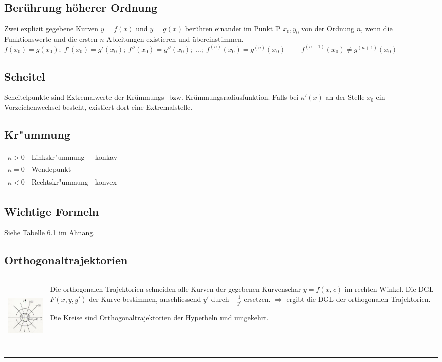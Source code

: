 \subsection{Berührung höherer Ordnung}
Zwei explizit gegebene Kurven $y = f(x)$ und $y = g(x)$ berühren einander im
Punkt P $x_0, y_0$ von der Ordnung $n$, wenn die Funktionswerte und die ersten
$n$ Ableitungen existieren und übereinstimmen.\\
$f(x_0) = g(x_0);\; f'(x_0) = g'(x_0);\; f''(x_0) = g''(x_0);\;\ldots ;
\;f^{(n)}(x_0) = g^{(n)}(x_0)\; \qquad f^{(n+1)}(x_0) \neq g^{(n+1)}(x_0)$

\subsection{Scheitel }
Scheitelpunkte sind Extremalwerte der Krümmungs- bzw. Krümmungsradiusfunktion.
Falls bei $\kappa'(x)$ an der Stelle $x_0$ ein Vorzeichenwechsel besteht, existiert dort
eine Extremalstelle. 

\subsection{Kr"ummung}
\begin{tabular}{lll}
  $\kappa > 0$ & Linkskr"ummung & konkav\\
  $\kappa = 0$ & Wendepunkt & \\
  $\kappa < 0$ & Rechtskr"ummung & konvex\\
  
\end{tabular}

\subsection{Wichtige Formeln}
Siehe Tabelle 6.1 im Ahnang.

\subsection{Orthogonaltrajektorien}
\begin{tabular}{ll}
\parbox{4.5cm}{
\includegraphics[height=4cm]{./bilder/orthoTrajekt.png}
}
& \parbox{14.5cm}{
Die orthogonalen Trajektorien schneiden alle Kurven der gegebenen Kurvenschar
$y=f(x,c)$ im rechten Winkel.\\
Die DGL $F(x,y,y')$ der Kurve bestimmen, anschliessend $y'$ durch
$-\frac{1}{y'}$ ersetzen.\\
$\Rightarrow$ ergibt die DGL der orthogonalen Trajektorien.\\
 \\
Die Kreise sind Orthogonaltrajektorien der Hyperbeln und umgekehrt.
}
\end{tabular}
